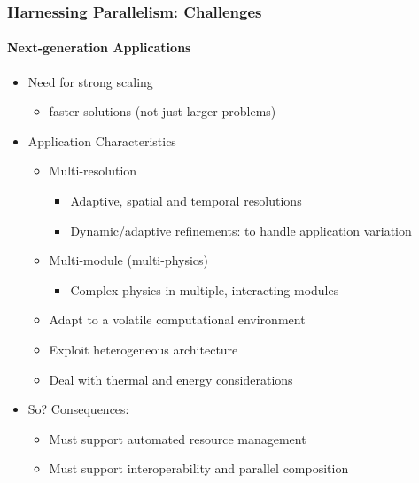 
\begin{frame}[t]
\frametitle{Harnessing Parallelism: Challenges}
\framesubtitle{Next-generation Applications}
  \begin{itemize}
    \item Need for strong scaling
      \begin{itemize}
      \item faster solutions (not just larger problems)
      \end{itemize}
    \item Application Characteristics
    \begin{itemize}
      \item Multi-resolution
        \begin{itemize}
      \item Adaptive, spatial and temporal resolutions
      \item Dynamic/adaptive refinements: to handle application
        variation
        \end{itemize}
      \item Multi-module (multi-physics)
        \begin{itemize}
        \item Complex physics in multiple, interacting modules
        \end{itemize}
      \item Adapt to a volatile computational environment
      \item Exploit heterogeneous architecture
      \item Deal with thermal and energy considerations
    \end{itemize}
    \pause
    \item So? Consequences:
    \begin{itemize}
      \item Must support automated resource management
      \item Must support interoperability and parallel composition
    \end{itemize}
  \end{itemize}
\end{frame}

